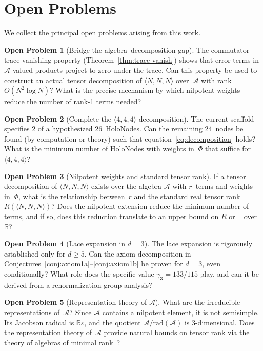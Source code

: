 \documentclass[11pt,a4paper]{article}
\theoremstyle{definition}
\newtheorem{openproblem}{Open Problem}[section]
\theoremstyle{remark}
\DeclareMathOperator{\brank}{\underline{R}}
\newcommand{\mmtensor}[3]{\langle #1, #2, #3 \rangle}
\begin{document}
\section{Open Problems}\label{sec:open}

We collect the principal open problems arising from this work.

\begin{openproblem}[Bridge the algebra--decomposition gap]
\label{op:bridge}
The commutator trace vanishing property
(Theorem~\ref{thm:trace-vanish}) shows that error terms in
$\mathcal{A}$-valued products project to zero under the trace.
Can this property be used to construct an actual tensor
decomposition of $\mmtensor{N}{N}{N}$ over~$\mathcal{A}$ with
rank $O(N^2 \log N)$? What is the precise mechanism by which
nilpotent weights reduce the number of rank-1 terms needed?
\end{openproblem}

\begin{openproblem}[Complete the $\mmtensor{4}{4}{4}$ decomposition]
\label{op:complete}
The current scaffold specifies 2 of a hypothesized 26~HoloNodes.
Can the remaining 24~nodes be found (by computation or theory)
such that equation~\eqref{eq:decomposition} holds? What is the
minimum number of HoloNodes with weights in~$\Phi$ that suffice
for $\mmtensor{4}{4}{4}$?
\end{openproblem}

\begin{openproblem}[Nilpotent weights and standard tensor rank]
\label{op:nilpotent-rank}
If a tensor decomposition of $\mmtensor{N}{N}{N}$ exists over the
algebra $\mathcal{A}$ with $r$~terms and weights in~$\Phi$, what
is the relationship between~$r$ and the standard real tensor rank
$R(\mmtensor{N}{N}{N})$? Does the nilpotent extension reduce
the minimum number of terms, and if so, does this reduction
translate to an upper bound on $R$ or $\brank$ over~$\mathbb{R}$?
\end{openproblem}

\begin{openproblem}[Lace expansion in $d = 3$]
\label{op:lace}
The lace expansion is rigorously established only for $d \ge 5$.
Can the axiom decomposition in
Conjectures~\ref{conj:axiom1a}--\ref{conj:axiom1b} be proven for
$d = 3$, even conditionally? What role does the specific value
$\gamma_3 = 133/115$ play, and can it be derived from a
renormalization group analysis?
\end{openproblem}

\begin{openproblem}[Representation theory of $\mathcal{A}$]
\label{op:rep-theory}
What are the irreducible representations of~$\mathcal{A}$? Since
$\mathcal{A}$ contains a nilpotent element, it is not semisimple.
Its Jacobson radical is $\mathbb{R}\varepsilon$, and the quotient
$\mathcal{A}/\mathrm{rad}(\mathcal{A})$ is 3-dimensional. Does
the representation theory of~$\mathcal{A}$ provide natural bounds
on tensor rank via the theory of algebras of
minimal rank~\cite{BlaserLysikov2020}?
\end{openproblem}
\end{document}
